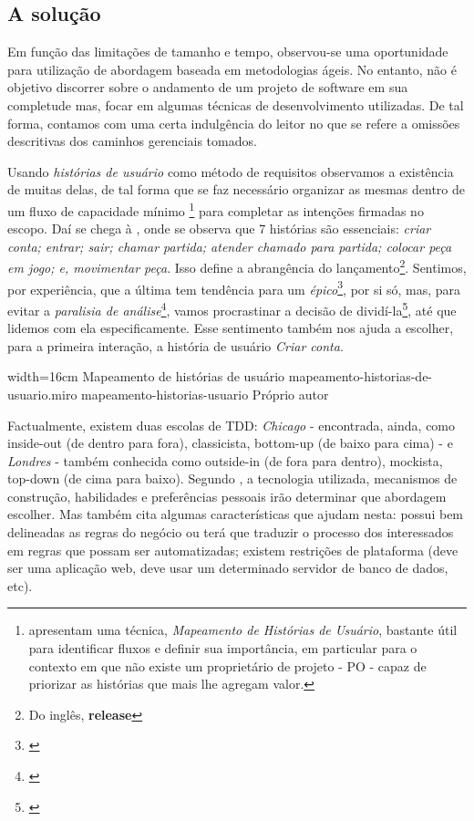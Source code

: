 \subsection{A solução}

  Em função das limitações de tamanho e tempo, observou-se uma oportunidade para utilização de abordagem baseada em metodologias ágeis. No entanto, não é objetivo discorrer sobre o andamento de um projeto de software em sua completude mas, focar em algumas técnicas de desenvolvimento utilizadas. De tal forma, contamos com uma certa indulgência do leitor no que se refere a omissões descritivas dos caminhos gerenciais tomados.

  Usando \emph{histórias de usuário} como método de requisitos observamos a existência de muitas delas, de tal forma que se faz necessário organizar as mesmas dentro de um fluxo de capacidade mínimo \footnote{ apresentam uma técnica, \emph{Mapeamento de Histórias de Usuário}, bastante útil para identificar fluxos e definir sua importância, em particular para o contexto em que não existe um proprietário de projeto - PO - capaz de priorizar as histórias que mais lhe agregam valor.} para completar as intenções firmadas no escopo. Daí se chega à , onde se observa que 7 histórias são essenciais: \emph{criar conta; entrar; sair; chamar partida; atender chamado para partida; colocar peça em jogo; e, movimentar peça}. Isso define a abrangência do lançamento\footnote{Do inglês, \textbf{release}}. Sentimos, por experiência, que a última tem tendência para um \emph{épico}\footnote{\cite[pág. 6]{Cohn2004}}, por si só, mas,  para evitar a \emph{paralisia de análise}\footnote{\cite[pág. 71]{Pugh2011}}, vamos procrastinar a decisão de dividí-la\footnote{\cite[pág. 24]{Cohn2004}}, até que lidemos com ela especificamente. Esse sentimento também nos ajuda a escolher, para a primeira interação, a história de usuário \emph{Criar conta}.

  \imagem
    {width=16cm}
    {Mapeamento de histórias de usuário}
    {mapeamento-historias-de-usuario.miro}
    {mapeamento-historias-usuario}
    {Próprio autor\footnotemark}

  Factualmente, existem duas escolas de TDD: \emph{Chicago} - encontrada, ainda, como inside-out (de dentro para fora), classicista, bottom-up (de baixo para cima) - e \emph{Londres} - também conhecida como outside-in (de fora para dentro), mockista, top-down (de cima para baixo). Segundo , a tecnologia utilizada, mecanismos de construção, habilidades e preferências pessoais irão determinar que abordagem escolher. Mas também cita algumas características que ajudam nesta: possui bem delineadas as regras do negócio ou terá que traduzir o processo dos interessados em regras que possam ser automatizadas; existem restrições de plataforma (deve ser uma aplicação web, deve usar um determinado servidor de banco de dados, etc).

